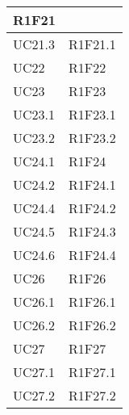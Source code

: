 \begin{center}
\begin{longtable}{|p{44mm}|p{22mm}|}
R1F21 \newline
\\
\hline
UC21.3 &

R1F21.1 \newline
\\
\hline
UC22 &

R1F22 \newline
\\
\hline
UC23 &

R1F23 \newline
\\
\hline
UC23.1 &

R1F23.1 \newline
\\
\hline
UC23.2 &

R1F23.2 \newline
\\
\hline
UC24.1 &

R1F24 \newline
\\
\hline
UC24.2 &

R1F24.1 \newline
\\
\hline
UC24.4 &

R1F24.2 \newline
\\
\hline
UC24.5 &

R1F24.3 \newline
\\
\hline
UC24.6 &

R1F24.4 \newline
\\
\hline
UC26 &

R1F26 \newline
\\
\hline
UC26.1 &

R1F26.1 \newline
\\
\hline
UC26.2 &

R1F26.2 \newline
\\
\hline
UC27 &

R1F27 \newline
\\
\hline
UC27.1 &

R1F27.1 \newline
\\
\hline
UC27.2 &

R1F27.2 \newline
\\
\hline

	\end{longtable}
\end{center}

